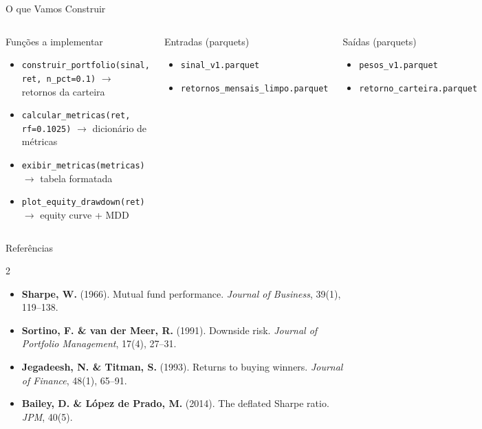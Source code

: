 \documentclass[aspectratio=169,12pt]{beamer}
\begin{document}
\begin{frame}[fragile]{O que Vamos Construir}
\begin{columns}[T]
\begin{block}{Funções a implementar}
\begin{itemize}
  \item \texttt{construir\_portfolio(sinal, ret, n\_pct=0.1)} $\to$ retornos da carteira
  \item \texttt{calcular\_metricas(ret, rf=0.1025)} $\to$ dicionário de métricas
  \item \texttt{exibir\_metricas(metricas)} $\to$ tabela formatada
  \item \texttt{plot\_equity\_drawdown(ret)} $\to$ equity curve + MDD
\end{itemize}
\end{block}
\begin{block}{Entradas (parquets)}
\begin{itemize}
  \item \texttt{sinal\_v1.parquet}
  \item \texttt{retornos\_mensais\_limpo.parquet}
\end{itemize}
\end{block}
\vspace{.4em}
\begin{exampleblock}{Saídas (parquets)}
\begin{itemize}
  \item \texttt{pesos\_v1.parquet}
  \item \texttt{retorno\_carteira.parquet}
\end{itemize}
\end{exampleblock}
\end{columns}
\end{frame}

\begin{frame}[fragile]{Referências}
\begin{multicols}{2}
\tiny
\begin{itemize}
  \item \textbf{Sharpe, W.} (1966). Mutual fund performance. \textit{Journal of Business}, 39(1), 119--138.
  \item \textbf{Sortino, F. \& van der Meer, R.} (1991). Downside risk. \textit{Journal of Portfolio Management}, 17(4), 27--31.
  \item \textbf{Jegadeesh, N. \& Titman, S.} (1993). Returns to buying winners. \textit{Journal of Finance}, 48(1), 65--91.
  \item \textbf{Bailey, D. \& López de Prado, M.} (2014). The deflated Sharpe ratio. \textit{JPM}, 40(5).
\end{itemize}
\end{multicols}
\end{frame}
\end{document}
